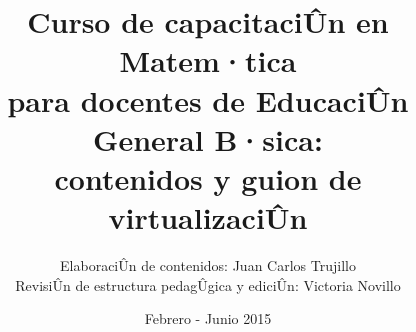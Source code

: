 \documentclass[11pt]{report}
\begin{document}
\nocite{*}

\title{Curso de capacitaciÛn en Matem·tica \\
para docentes de EducaciÛn General B·sica: \\
contenidos y guion de virtualizaciÛn}
\author{ElaboraciÛn de contenidos: Juan Carlos Trujillo \\
RevisiÛn de estructura pedagÛgica y ediciÛn: Victoria Novillo}
\date{Febrero - Junio 2015}
\newpage\cleartooddpage[\thispagestyle{empty}]

\def\chaptername{SecciÛn}

\cleartooddpage[\thispagestyle{empty}]

%

%
\end{document}
